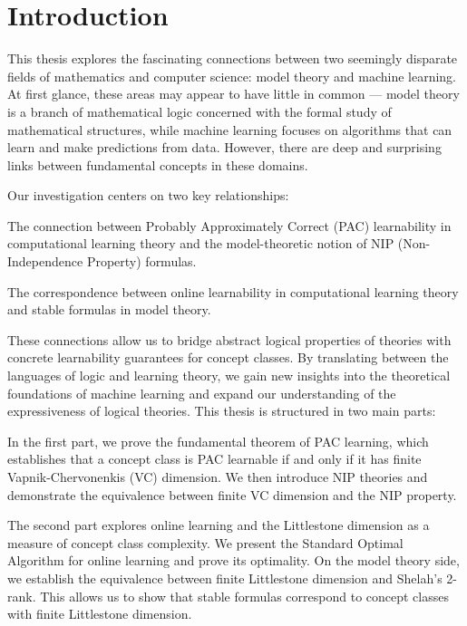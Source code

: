 \clearpage
\newpage\null\thispagestyle{empty}\newpage
{}

\section*{Introduction}

\begin{outline}
\0 This thesis explores the fascinating connections between two seemingly disparate fields of mathematics and computer science: model theory and machine learning. At first glance, these areas may appear to have little in common --- model theory is a branch of mathematical logic concerned with the formal study of mathematical structures, while machine learning focuses on algorithms that can learn and make predictions from data. However, there are deep and surprising links between fundamental concepts in these domains. 

Our investigation centers on two key relationships:

\1 The connection between Probably Approximately Correct (PAC) learnability in computational learning theory and the model-theoretic notion of NIP (Non-Independence Property) formulas.

\1 The correspondence between online learnability in computational learning theory and stable formulas in model theory.

\0 These connections allow us to bridge abstract logical properties of theories with concrete learnability guarantees for concept classes. By translating between the languages of logic and learning theory, we gain new insights into the theoretical foundations of machine learning and expand our understanding of the expressiveness of logical theories. This thesis is structured in two main parts:

\0 In the first part, we prove the fundamental theorem of PAC learning, which establishes that a concept class is PAC learnable if and only if it has finite Vapnik-Chervonenkis (VC) dimension. We then introduce NIP theories and demonstrate the equivalence between finite VC dimension and the NIP property. 

\0 The second part explores online learning and the Littlestone dimension as a measure of concept class complexity. We present the Standard Optimal Algorithm for online learning and prove its optimality. On the model theory side, we establish the equivalence between finite Littlestone dimension and Shelah's 2-rank. This allows us to show that stable formulas correspond to concept classes with finite Littlestone dimension.


\end{outline}
